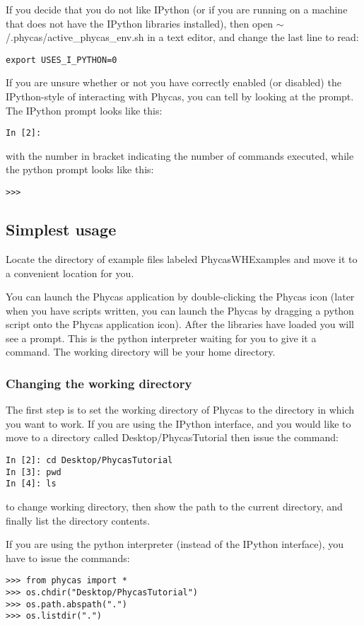 \documentclass{article}
\newcommand{\phycas}{Phycas\xspace}
\newcommand{\localfile}[1]{\textsf{#1}\xspace}
\begin{document}
If you decide that you do not like IPython (or if you are running on a machine that does not have the IPython libraries installed), then open 
\localfile{$\sim$/.phycas/active\_phycas\_env.sh} 
in a text editor, and change the last line to read:
\begin{verbatim}
export USES_I_PYTHON=0
\end{verbatim}

If you are unsure whether or not you have correctly enabled (or disabled) the IPython-style of interacting with \phycas, you can tell by looking at the prompt.
The IPython prompt looks like this:
\begin{verbatim}
In [2]: 
\end{verbatim}
with the number in bracket indicating the number of commands executed, while the python prompt looks like this:
\begin{verbatim}
>>>
\end{verbatim}


\subsection{Simplest usage}
Locate the directory of example files labeled \localfile{PhycasWHExamples} and move it to a convenient location for you.


You can launch the \phycas application by double-clicking the \phycas icon  (later when you have scripts written, you can launch the \phycas by dragging a python script onto the \phycas application icon).
After the libraries have loaded you will see a prompt.
This is the python interpreter waiting for you to give it a command.
The working directory will be your home directory.

\subsubsection{Changing the working directory}
The first step is to set the working directory of \phycas to the directory in which you want to work.
If you are using the IPython interface, and you would like to  move to a directory called \localfile{Desktop/PhycasTutorial} then issue the command:
\begin{verbatim}
In [2]: cd Desktop/PhycasTutorial
In [3]: pwd
In [4]: ls
\end{verbatim}
to change working directory, then show the path to the current directory, and finally list the directory contents.

If you are using the  python interpreter (instead of the IPython interface), you have to issue the commands:
\begin{verbatim}
>>> from phycas import *
>>> os.chdir("Desktop/PhycasTutorial")
>>> os.path.abspath(".")
>>> os.listdir(".")
\end{verbatim}
\end{document}
